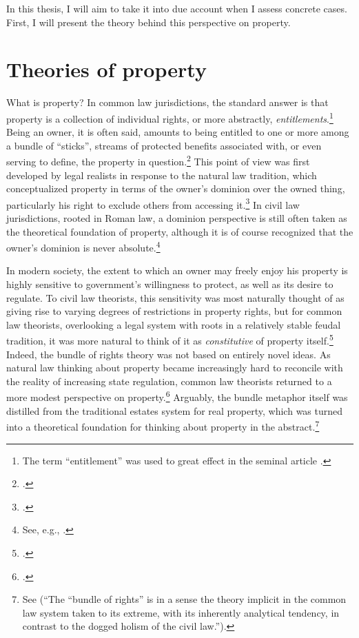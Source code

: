 In this thesis, I will aim to take it into due account when I assess concrete cases. First, I will present the theory behind this perspective on property.

\section{Theories of property}

What is property? In common law jurisdictions, the standard answer is that property is a collection of individual rights, or more abstractly, {\it entitlements}.\footnote{The term ``entitlement'' was used to great effect in the seminal article \cite{calabresi72}.} Being an owner, it is often said, amounts to being entitled to one or more among a bundle of ``sticks'', streams of protected benefits associated with, or even serving to define, the property in question.\footcite[357-358]{merrill01} This point of view was first developed by legal realists in response to the natural law tradition, which conceptualized property in terms of the owner's dominion over the owned thing, particularly his right to exclude others from accessing it.\footcite[193-195]{klein11} In civil law jurisdictions, rooted in Roman law, a dominion perspective is still often taken as the theoretical foundation of property, although it is of course recognized that the owner's dominion is never absolute.\footnote{See, e.g., \cite[?]{foster10}.}

In modern society, the extent to which an owner may freely enjoy his property is highly sensitive to government's willingness to protect, as well as its desire to regulate. To civil law theorists, this sensitivity was most naturally thought of as giving rise to varying degrees of restrictions in property rights, but for common law theorists, overlooking a legal system with roots in a relatively stable feudal tradition, it was more natural to think of it as {\it constitutive} of property itself.\footcite[7]{chang12} Indeed, the bundle of rights theory was not based on entirely novel ideas. As natural law thinking about property became increasingly hard to reconcile with the reality of increasing state regulation, common law theorists returned to a more modest perspective on property.\footcite[195]{klein11} Arguably, the bundle metaphor itself was distilled from the traditional estates system for real property, which was turned into a theoretical foundation for thinking about property in the abstract.\footnote{See \cite[7]{chang12}   
(``The ``bundle of rights'' is in a sense the theory implicit in the common law system taken to its extreme, with its inherently analytical tendency, in contrast to the dogged holism of the civil law.'').} 

